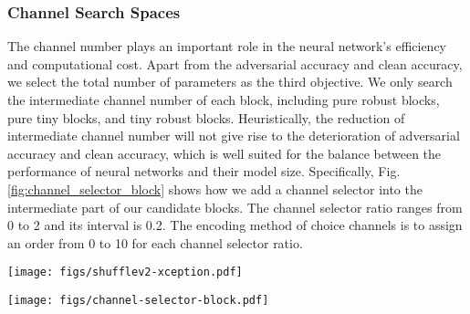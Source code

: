 \documentclass[journal]{IEEEtran}
\begin{document}
\subsubsection{\textbf{Channel Search Spaces}}
The channel number plays an important role in the neural network's efficiency and computational cost. Apart from the adversarial accuracy and clean accuracy, we select the total number of parameters as the third objective. We only search the intermediate channel number of each block, including pure robust blocks, pure tiny blocks, and tiny robust blocks. Heuristically, the reduction of intermediate channel number will not give rise to the deterioration of adversarial accuracy and clean accuracy, which is well suited for the balance between the performance of neural networks and their model size. Specifically, Fig. \ref{fig:channel_selector_block} shows how we add a channel selector into the intermediate part of our candidate blocks. The channel selector ratio ranges from 0 to 2 and its interval is 0.2. The encoding method of choice channels is to assign an order from 0 to 10 for each channel selector ratio. 

\begin{figure*}
\begin{center}
\texttt{[image: figs/shufflev2-xception.pdf]}
\end{center}
\caption{(a) and (b) represent the internal architectures of the tiny robust blocks. K refer to the kernel size and it ranges among 3, 5, 7. The dashed line indicates the internal search space for the tiny robust blocks. So if we removed the non-local layer from the main branch of (a) and (b), (a) and (b) will denote as the pure tiny blocks. (c) represents the internal architectures of the pure robust blocks. The upper part of (c) represents the combination of SE layer and Embedded-Gaussian non-local layer. The bottom part of (c) represents the combination of SE layer and Gaussian non-local layer.}
\label{fig:shuffl2v2_block_choices}
\end{figure*}

\begin{figure*}
\begin{center}
\texttt{[image: figs/channel-selector-block.pdf]}
\end{center}
\caption{(a), (b), (c) shows that how we add the channel selector into the tiny robust blocks and the pure robust blocks, respectively.  refer to the kernel size and it ranges among 3, 5, 7. The dashed line indicates the internal search space for the tiny robust blocks. So if we removed the non-local layer from the main branch of (a) and (b), (a) and (b) will denote as the pure tiny blocks. }
\label{fig:channel_selector_block}
\end{figure*}
\end{document}
